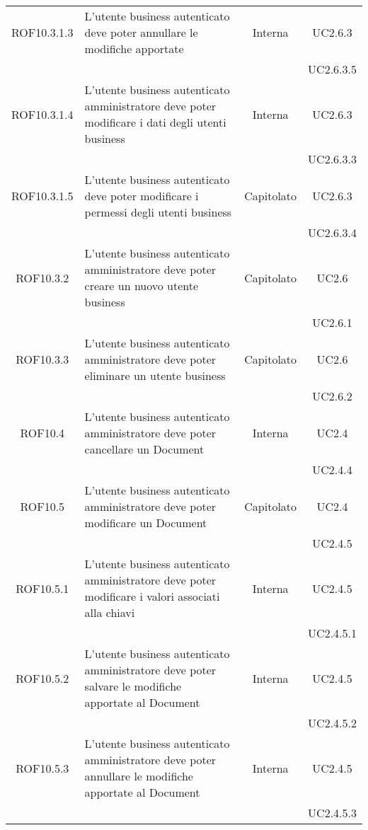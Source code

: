 \begin{longtable}{|c|p{6cm}|c|c|}
\midrule
ROF10.3.1.3
& L'utente business autenticato deve poter annullare le modifiche apportate
& Interna
& UC2.6.3\\
& & & UC2.6.3.5
\\

\midrule
ROF10.3.1.4
& L'utente business autenticato amministratore deve poter modificare i dati degli utenti business
& Interna
& UC2.6.3\\
& & & UC2.6.3.3
\\

\midrule
ROF10.3.1.5
& L'utente business autenticato deve poter modificare i permessi degli utenti business
& Capitolato
& UC2.6.3\\
& & & UC2.6.3.4
\\

\midrule
ROF10.3.2
& L'utente business autenticato amministratore deve poter creare un nuovo utente business
& Capitolato
& UC2.6\\
& & & UC2.6.1
\\

\midrule
ROF10.3.3
& L'utente business autenticato amministratore deve poter eliminare un utente business
& Capitolato
& UC2.6\\
& & & UC2.6.2
\\

\midrule
ROF10.4
& L'utente business autenticato amministratore deve poter cancellare un Document
& Interna
& UC2.4\\
& & & UC2.4.4
\\

\midrule
ROF10.5
& L'utente business autenticato amministratore deve poter modificare un Document
& Capitolato
& UC2.4\\
& & & UC2.4.5
\\

\midrule
ROF10.5.1
& L'utente business autenticato amministratore deve poter modificare i valori associati alla chiavi
& Interna
& UC2.4.5\\
& & & UC2.4.5.1
\\

\midrule
ROF10.5.2
& L'utente business autenticato amministratore deve poter salvare le modifiche apportate al Document
& Interna
& UC2.4.5\\
& & & UC2.4.5.2
\\

\midrule
ROF10.5.3
& L'utente business autenticato amministratore deve poter annullare le modifiche apportate al Document
& Interna
& UC2.4.5\\
& & & UC2.4.5.3
\\


\end{longtable}
